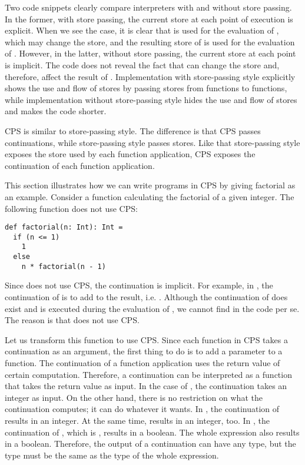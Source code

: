 Two code snippets clearly compare interpreters with and without store passing.
In the former, with store passing, the current store at each point of execution
is explicit. When we see the  case, it is clear that
 is used for the evaluation of , which may change the store,
and the resulting store of  is used for the evaluation of .
However, in the latter, without store passing, the current store at each point
is implicit. The code does not reveal the fact that  can change the store and, therefore, affect the result of . Implementation with store-passing style explicitly shows the use and flow of
stores by passing stores from functions to functions, while implementation
without store-passing style hides the use and flow of stores and makes the code
shorter.

CPS is similar to store-passing style. The difference is that CPS passes
continuations, while store-passing style passes stores. Like that store-passing
style exposes the store used by each function application, CPS exposes the
continuation of each function application.

This section illustrates how we can write programs in CPS by giving factorial as
an example. Consider a function calculating the factorial of a given integer.
The following function does not use CPS:
\begin{verbatim}
def factorial(n: Int): Int =
  if (n <= 1)
    1
  else
    n * factorial(n - 1)
\end{verbatim}
Since  does not use CPS, the continuation is implicit.
For example, in ,
the continuation of  is to add  to the
result, i.e. . Although the continuation of 
does exist and is executed during the evaluation of ,
we cannot find  in the code per se. The reason is that
 does not use CPS.

Let us transform this function to use CPS. Since each function in CPS takes a
continuation as an argument, the first thing to do is to add a parameter to a
function. The continuation of a function application uses the return value of
certain computation.
Therefore, a continuation can be interpreted as a function that takes
the return value as input. In the case of , the continuation
takes an integer as input.
On the other hand, there is no restriction on what the continuation
computes; it can do whatever it wants. In , the
continuation of  results in an integer. At the same time,
 results in an integer, too. In ,
the continuation of , which is , results in a boolean. The whole
expression  also results in a boolean.
Therefore, the output of a continuation can have any type,
but the type must be the same as the type of the whole expression.

